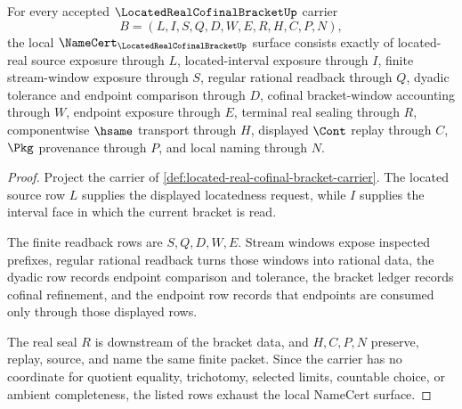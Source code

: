 \begin{theorem}
\label{thm:located-real-cofinal-bracket-namecert-obligations}
For every accepted $\LocatedRealCofinalBracketUp$ carrier
$$
B=(L,I,S,Q,D,W,E,R,H,C,P,N),
$$
the local $\NameCert_{\LocatedRealCofinalBracketUp}$ surface consists exactly of located-real source exposure through $L$, located-interval exposure through $I$, finite stream-window exposure through $S$, regular rational readback through $Q$, dyadic tolerance and endpoint comparison through $D$, cofinal bracket-window accounting through $W$, endpoint exposure through $E$, terminal real sealing through $R$, componentwise $\hsame$ transport through $H$, displayed $\Cont$ replay through $C$, $\Pkg$ provenance through $P$, and local naming through $N$.
\end{theorem}
\begin{proof}
Project the carrier of \autoref{def:located-real-cofinal-bracket-carrier}. The located source row $L$ supplies the displayed locatedness request, while $I$ supplies the interval face in which the current bracket is read.

The finite readback rows are $S,Q,D,W,E$. Stream windows expose inspected prefixes, regular rational readback turns those windows into rational data, the dyadic row records endpoint comparison and tolerance, the bracket ledger records cofinal refinement, and the endpoint row records that endpoints are consumed only through those displayed rows.

The real seal $R$ is downstream of the bracket data, and $H,C,P,N$ preserve, replay, source, and name the same finite packet. Since the carrier has no coordinate for quotient equality, trichotomy, selected limits, countable choice, or ambient completeness, the listed rows exhaust the local NameCert surface.
\end{proof}

